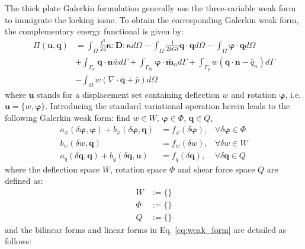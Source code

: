 The thick plate Galerkin formulation generally use the three-variable weak form to immigrate the locking issue.
To obtain the corresponding Galerkin weak form, the complementary energy functional is given by:
\begin{equation}
    \begin{aligned}
        \Pi(\boldsymbol u, \boldsymbol q) &=
        \int_\Omega \frac{t^3}{24} \boldsymbol \kappa : \boldsymbol D : \boldsymbol \kappa d\Omega - \int_\Omega \frac{1}{2kGt} \boldsymbol q \cdot \boldsymbol q d\Omega - \int_\Omega \boldsymbol \varphi \cdot \boldsymbol q d\Omega \\
        &+ \int_{\Gamma_w} \boldsymbol q \cdot \boldsymbol n \bar w d\Gamma + \int_{\Gamma_m} \boldsymbol \varphi \cdot \bar{\boldsymbol m}_n d\Gamma + \int_{\Gamma_q} w (\boldsymbol q \cdot \boldsymbol n - \bar q_n) d\Gamma \\&- \int_\Omega w (\nabla \cdot \boldsymbol q + \bar p) d\Omega
    \end{aligned}
\end{equation}
where $\boldsymbol u$ stands for a displacement set containing deflection $w$ and rotation $\boldsymbol \varphi$, i.e. $\boldsymbol u = \{w,\boldsymbol \varphi\}$.
Introducing the standard variational operation herein leads to the following Galerkin weak form:
find $w \in W$, $\boldsymbol \varphi \in \Phi$, $\boldsymbol q \in Q$,
\begin{equation}\label{eq:weak_form}
\begin{aligned}
a_\varphi(\delta \boldsymbol \varphi, \boldsymbol \varphi) + b_{\varphi}(\delta\boldsymbol \varphi,\boldsymbol q) &= f_{\varphi}(\delta \boldsymbol \varphi), & \forall \delta \boldsymbol \varphi \in \Phi \\
b_{w}(\delta w,\boldsymbol q) &= f_{w}(\delta w), & \forall \delta w \in W \\
a_q(\delta \boldsymbol q,\boldsymbol q) + b_q(\delta \boldsymbol q,\boldsymbol u) &= f_{q}(\delta \boldsymbol q), & \forall \delta \boldsymbol q \in Q
\end{aligned}
\end{equation}
where the deflection space $W$, rotation space $\Phi$ and shear force space $Q$ are defined as:
\begin{align}
    W &:= \{\} \\
    \Phi &:= \{\} \\
    Q &:= \{\}
\end{align}
and the bilinear forms and linear forms in Eq. \eqref{eq:weak_form} are detailed as follows:
